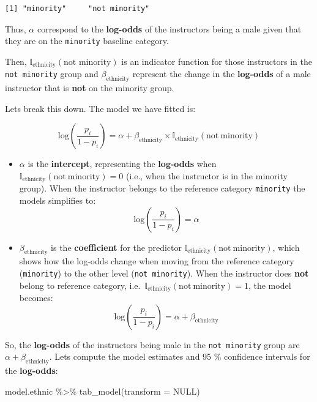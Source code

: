 \documentclass[
  letterpaper,
  DIV=11,
  numbers=noendperiod]{scrartcl}
\newenvironment{Shaded}{\begin{snugshade}}{\end{snugshade}}
\newcommand{\AttributeTok}[1]{\textcolor[rgb]{0.40,0.45,0.13}{#1}}
\newcommand{\ConstantTok}[1]{\textcolor[rgb]{0.56,0.35,0.01}{#1}}
\newcommand{\FunctionTok}[1]{\textcolor[rgb]{0.28,0.35,0.67}{#1}}
\newcommand{\NormalTok}[1]{\textcolor[rgb]{0.00,0.23,0.31}{#1}}
\newcommand{\SpecialCharTok}[1]{\textcolor[rgb]{0.37,0.37,0.37}{#1}}
\begin{document}
\begin{verbatim}
[1] "minority"     "not minority"
\end{verbatim}

Thus, \(\alpha\) correspond to the \textbf{log-odds} of the instructors
being a male given that they are on the \texttt{minority} baseline
category.

Then, \(\mathbb{I}_{\text{ethnicity}}(\text{not minority})\) is an
indicator function for those instructors in the \texttt{not\ minority}
group and \(\beta_{\text{ethnicity}}\) represent the change in the
\textbf{log-odds} of a male instructor that is \textbf{not} on the
minority group.

Lets break this down. The model we have fitted is:

\[
\mathrm{log}\left(\dfrac{p_i}{1-p_i}\right) = \alpha + \beta_{\text{ethnicity}}  \times \mathbb{I}_{\mathrm{ethnicity}}(\mathrm{not~  minority})
\]

\begin{itemize}
\item
  \(\alpha\) is the \textbf{intercept}, representing the
  \textbf{log-odds} when
  \(\mathbb{I}_{\mathrm{ethnicity}}(\mathrm{not~ minority}) = 0\) (i.e.,
  when the instructor is in the minority group). When the instructor
  belongs to the reference category \texttt{minority} the models
  simplifies to:
  \[\mathrm{log}\left(\frac{p_i}{1-p_i}\right) = \alpha \]
\item
  \(\beta_{\mathrm{ethnicity}}\) is the \textbf{coefficient} for the
  predictor \(\mathbb{I}_{\mathrm{ethnicity}}(\mathrm{not~ minority})\),
  which shows how the log-odds change when moving from the reference
  category (\texttt{minority}) to the other level
  (\texttt{not\ minority}). When the instructor does \textbf{not} belong
  to reference category,
  i.e.~\(\mathbb{I}_{\mathrm{ethnicity}}(\mathrm{not~ minority}) = 1\),
  the model becomes:
  \[\mathrm{log}\left(\dfrac{p_i}{1-p_i}\right) = \alpha + \beta_{\text{ethnicity}}\]
\end{itemize}

So, the \textbf{log-odds} of the instructors being male in the
\texttt{not\ minority} group are \(\alpha +\beta_{\text{ethnicity}}\).
Lets compute the model estimates and 95 \% confidence intervals for the
\textbf{log-odds}:

\begin{Shaded}
\begin{Highlighting}[]
\NormalTok{model.ethnic }\SpecialCharTok{\%\textgreater{}\%}
  \FunctionTok{tab\_model}\NormalTok{(}\AttributeTok{transform =} \ConstantTok{NULL}\NormalTok{)}
\end{Highlighting}
\end{Shaded}
\end{document}
